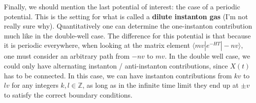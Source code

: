 \documentclass[11pt, oneside]{article}   	%
\theoremstyle{definition}
\begin{document}
Finally, we should mention the last potential of interest: the case of a periodic potential. This is the setting for what is called a \textbf{dilute 
instanton gas} (I'm not really sure why). Quantitatively one can determine the one-instanton contribution much like in the 
double-well case. The difference for this potential is that because it is periodic everywhere, when looking at the matrix element 
$\langle mv | e^{-HT} | -nv\rangle$, one must consider an arbitrary path from $-nv$ to $mv$. In the double well case, we could only have 
alternating instanton / anti-instanton contributions, since $X(t)$ has to be connected. In this case, we can have instanton 
contributions from $kv$ to $lv$ for any integers $k, l\in\mathbb Z$, as long as in the infinite time limit they end up at $\pm v$ to satisfy 
the correct boundary conditions. 
\end{document}
